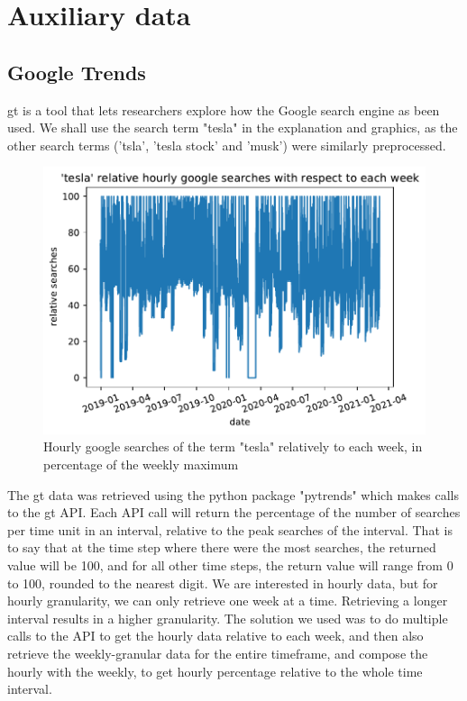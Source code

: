\section{Auxiliary data}
\subsection{Google Trends}
\acrfull{gt} is a tool that lets researchers explore how the Google search engine as been used. We shall use the search term "tesla" in the explanation and graphics, as the other search terms ('tsla', 'tesla stock' and 'musk') were similarly preprocessed.

\begin{figure}[h]
	\centering
	\includegraphics[width=\textwidth]{img/img_GT_tesla_raw.pdf}
	\caption{Hourly google searches of the term "tesla" relatively to each week, in percentage of the weekly maximum}
	\label{fig:GT_tesla_raw}
\end{figure}


The \acrlong{gt} data was retrieved using the python package "pytrends" which makes calls to the \acrlong{gt} \Gls{API}. Each \Gls{API} call will return the percentage of the number of searches per time unit in an interval, relative to the peak searches of the interval. That is to say that at the time step where there were the most searches, the returned value will be 100, and for all other time steps, the return value will range from 0 to 100, rounded to the nearest digit.
We are interested in hourly data, but for hourly granularity, we can only retrieve one week at a time. Retrieving a longer interval results in a higher granularity. The solution we used was to do multiple calls to the \Gls{API} to get the hourly data relative to each week, and then also retrieve the weekly-granular data for the entire timeframe, and compose the hourly with the weekly, to get hourly percentage relative to the whole time interval.

